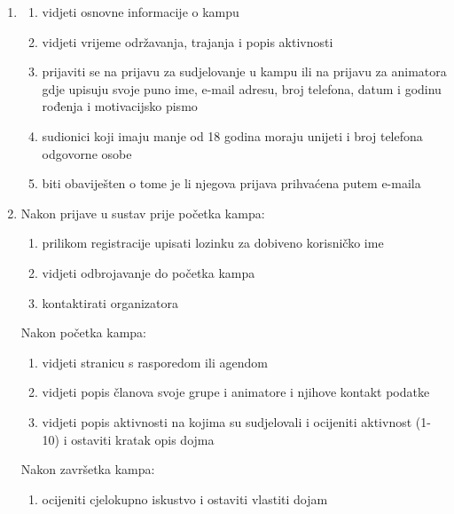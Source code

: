 \begin{enumerate}
	\item {} 
	\begin{enumerate}
		\item vidjeti osnovne informacije o kampu
		\item vidjeti vrijeme održavanja, trajanja i popis aktivnosti
		\item prijaviti se na prijavu za sudjelovanje u kampu ili na prijavu za animatora gdje upisuju svoje puno ime, e-mail adresu, broj telefona, datum i godinu rođenja i motivacijsko pismo
		\item sudionici koji imaju manje od 18 godina moraju unijeti i broj telefona odgovorne osobe
		\item biti obaviješten o tome je li njegova prijava prihvaćena putem e-maila \\
	\end{enumerate} 
	\item {}
	\newline Nakon prijave u sustav prije početka kampa:
	\begin{enumerate}
		\item prilikom registracije upisati lozinku za dobiveno korisničko ime
		\item vidjeti odbrojavanje do početka kampa
		\item kontaktirati organizatora
	\end{enumerate}
	Nakon početka kampa:
	\begin{enumerate}
		\item vidjeti stranicu s rasporedom ili agendom
		\item vidjeti popis članova svoje grupe i animatore i njihove kontakt podatke
		\item vidjeti popis aktivnosti na kojima su sudjelovali i ocijeniti aktivnost (1-10) i ostaviti kratak opis dojma
	\end{enumerate}
	Nakon završetka kampa:
	\begin{enumerate}
		\item ocijeniti cjelokupno iskustvo i ostaviti vlastiti dojam\\
	\end{enumerate}
	

\end{enumerate}
